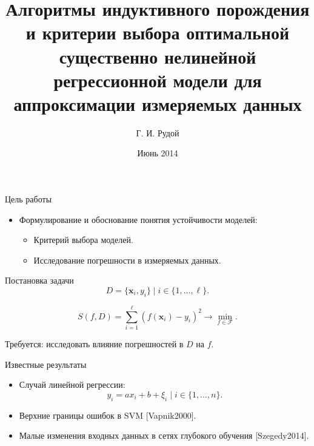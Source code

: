\documentclass{beamer}
\begin{document}
\title[Порождение и выбор моделей\hspace{4em}\insertframenumber/\inserttotalframenumber]{Алгоритмы индуктивного порождения и критерии выбора оптимальной существенно нелинейной регрессионной модели для аппроксимации измеряемых данных}
\author{Г. И. Рудой}
\date{Июнь 2014}

\begin{frame}
  \maketitle
\end{frame}

\begin{frame}{Цель работы}
  \begin{itemize}
	\item Формулирование и обоснование понятия устойчивости моделей:
	\begin{itemize}
	  \item Критерий выбора моделей.
	  \item Исследование погрешности в измеряемых данных.
	\end{itemize}
  \end{itemize}
\end{frame}

\begin{frame}{Постановка задачи}
  \[
	D = \{ \mathbf{x}_i, y_i \} \mid i \in \{ 1, \dots, \ell \}.
  \]
  
  \[
    S(f, D) = \sum_{i = 1}^\ell (f(\mathbf{x}_i) - y_i)^2 \rightarrow \mathop{\min}\limits_{f \in \mathcal{F}}.
  \]
  
  Требуется: исследовать влияние погрешностей в $D$ на $f$.
\end{frame}

\begin{frame}{Известные результаты}
  \begin{itemize}
    \item Случай линейной регрессии:
      \[
        y_i = ax_i + b + \xi_i \mid i \in \{ 1, \dots, n \}.
      \]
    \item Верхние границы ошибок в SVM [Vapnik2000].
    \item Малые изменения входных данных в сетях глубокого обучения [Szegedy2014].
  \end{itemize}
\end{frame}
\end{document}
